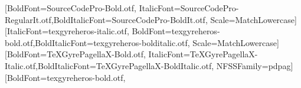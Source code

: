 \usepackage{iftex}
\ifXeTeX\else
  \usepackage[utf8]{inputenc}
\fi
\usepackage[T1]{fontenc}
\usepackage{newpxtext}
\usepackage{newpxmath}
\usepackage{iftex}
\ifXeTeX
  \usepackage{fontspec}
  \setmonofont{SourceCodePro-Regular.otf}[BoldFont=SourceCodePro-Bold.otf,
    ItalicFont=SourceCodePro-RegularIt.otf,BoldItalicFont=SourceCodePro-BoldIt.otf,
    Scale=MatchLowercase]
  \setsansfont{texgyreheros-regular.otf}[ItalicFont=texgyreheros-italic.otf,
    BoldFont=texgyreheros-bold.otf,BoldItalicFont=texgyreheros-bolditalic.otf,
    Scale=MatchLowercase]
  \newfontfamily{}[BoldFont=TeXGyrePagellaX-Bold.otf,
    ItalicFont=TeXGyrePagellaX-Italic.otf,BoldItalicFont=TeXGyrePagellaX-BoldItalic.otf,
    NFSSFamily=pdpag]
  \newfontfamily{}[BoldFont=texgyreheros-bold.otf,
